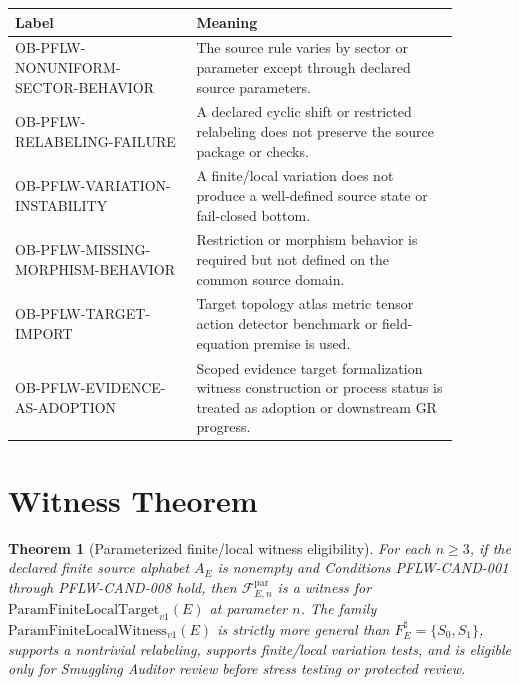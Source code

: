 \documentclass[11pt]{article}
\newcommand{\PFLFT}{\mathrm{ParamFiniteLocalTarget}_{v1}}
\newcommand{\PFLFW}{\mathrm{ParamFiniteLocalWitness}_{v1}}
\newtheorem{theorem}{Theorem}
\begin{document}
\begin{longtable}{p{0.36\linewidth}p{0.52\linewidth}}
\toprule
Label & Meaning \\
\midrule
OB-PFLW-NONUNIFORM-SECTOR-BEHAVIOR & The source rule varies by sector or parameter except through declared source parameters. \\
OB-PFLW-RELABELING-FAILURE & A declared cyclic shift or restricted relabeling does not preserve the source package or checks. \\
OB-PFLW-VARIATION-INSTABILITY & A finite/local variation does not produce a well-defined source state or fail-closed bottom. \\
OB-PFLW-MISSING-MORPHISM-BEHAVIOR & Restriction or morphism behavior is required but not defined on the common source domain. \\
OB-PFLW-TARGET-IMPORT & Target topology atlas metric tensor action detector benchmark or field-equation premise is used. \\
OB-PFLW-EVIDENCE-AS-ADOPTION & Scoped evidence target formalization witness construction or process status is treated as adoption or downstream GR progress. \\
\bottomrule
\end{longtable}

\section{Witness Theorem}

\begin{theorem}[Parameterized finite/local witness eligibility]
For each \(n\ge 3\), if the declared finite source alphabet \(A_E\) is
nonempty and Conditions PFLW-CAND-001 through PFLW-CAND-008 hold, then
\(\mathcal{F}^{\mathrm{par}}_{E,n}\) is a witness for \(\PFLFT(E)\) at
parameter \(n\). The family \(\PFLFW(E)\) is strictly more general than
\(F_E^\sharp=\{S_0,S_1\}\), supports a nontrivial relabeling, supports
finite/local variation tests, and is eligible only for Smuggling Auditor
review before stress testing or protected review.
\end{theorem}
\end{document}
